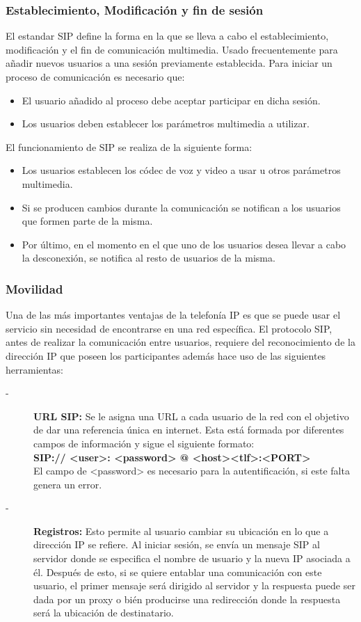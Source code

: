 \documentclass[a4paper, 11pt]{article} %
\begin{document}
		\subsubsection{Establecimiento, Modificación y fin de sesión}
		El estandar SIP define la forma en la que se lleva a cabo el establecimiento, modificación y el fin de comunicación multimedia. Usado frecuentemente para añadir nuevos usuarios a una sesión previamente establecida. Para iniciar un proceso de comunicación es necesario que:
		\begin{itemize}
			\item El usuario añadido al proceso debe aceptar participar en dicha sesión.
			\item Los usuarios deben establecer los parámetros multimedia a utilizar.
		\end{itemize}
		El funcionamiento de SIP se realiza de la siguiente forma:
		\begin{itemize}
			\item Los usuarios establecen los códec de voz y video a usar u otros parámetros multimedia.
			\item Si se producen cambios durante la comunicación se notifican a los usuarios que formen parte de la misma.
			\item Por último, en el momento en el que uno de los usuarios desea llevar a cabo la desconexión, se notifica al resto de usuarios de la misma.
		\end{itemize}				
		
		\subsubsection{Movilidad}
		Una de las más importantes ventajas de la telefonía IP es que se puede usar el servicio sin necesidad de encontrarse en una red específica. El protocolo SIP, antes de realizar la comunicación entre usuarios, requiere del reconocimiento de la dirección IP que poseen los participantes además hace uso de las siguientes herramientas:
		\begin{description}
			\item[-]\textbf{URL SIP:} Se le asigna una URL a cada usuario de la red con el objetivo de dar una referencia única en internet. Esta está formada por diferentes campos de información y sigue el siguiente formato:\\
			\textbf{SIP:// <user>: <password> @ <host><tlf>:<PORT>}\\
			El campo de <password> es necesario para la autentificación, si este falta genera un error.
			\item[-]\textbf{Registros:} Esto permite al usuario cambiar su ubicación en lo que a dirección IP se refiere. Al iniciar sesión, se envía un mensaje SIP al servidor donde se especifica el nombre de usuario y la nueva IP asociada a él. Después de esto, si se quiere entablar una comunicación con este usuario, el primer mensaje será dirigido al servidor y la respuesta puede ser dada por un proxy o bién producirse una redirección donde la respuesta será la ubicación de destinatario.
		\end{description}
	
\end{document}

